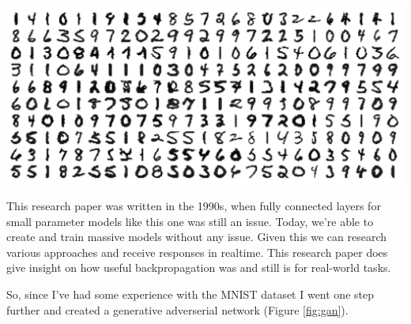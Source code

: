 \documentclass[a4paper,12pt]{report}
\begin{document}
\begin{center}
    \captionsetup{type=figure}
    \includegraphics[width=.7\linewidth]{media/numbers.png}
\end{center}

This research paper was written in the 1990s, when fully connected layers for small parameter models like this one was still an issue. Today, we're able to create and train massive models without any issue. Given this we can research various approaches and receive responses in realtime. This research paper does give insight on how useful backpropagation was and still is for real-world tasks.

So, since I've had some experience with the MNIST dataset I went one step further and created a generative adverserial network (Figure \ref{fig:gan}).
\end{document}
